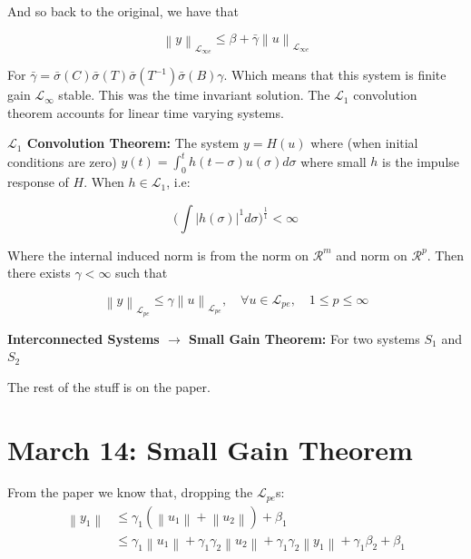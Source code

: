 \documentclass[11pt]{article}
\newcommand{\norm}[1]{\left\lVert#1\right\rVert}
\begin{document}
And so back to the original, we have that 

\begin{equation}
	\norm{y}_{\mathcal{L}_{\infty e}} \leq \beta + \bar{\gamma} \norm{u}_{\mathcal{L}_{\infty e}}
\end{equation}

For $\bar{\gamma} = \bar{\sigma}(C)\bar{\sigma}(T)\bar{\sigma}(T^{-1})\bar{\sigma}(B) \gamma$. Which means that this system is finite gain $\mathcal{L}_{\infty}$ stable. This was the time invariant solution. The $\mathcal{L}_1$ convolution theorem accounts for linear time varying systems. 

\textbf{$\mathcal{L}_1$ Convolution Theorem:} The system $y = H(u)$ where (when initial conditions are zero) $y(t) = \int_0^t h(t-\sigma)u(\sigma)d\sigma$ where small $h$ is the impulse response of $H$. When $h \in \mathcal{L}_1$, i.e: 

\begin{equation}
 \bigg ( \int \rvert h(\sigma) \rvert^1 d\sigma \bigg)^{\frac{1}{1}} < \infty	
\end{equation}

Where the internal induced norm is from the norm on $\mathcal{R}^m$ and norm on $\mathcal{R}^p$. Then there exists $\gamma < \infty$ such that 

\begin{equation}
 \norm{y}_{\mathcal{L}_{pe}} \leq \gamma \norm{u}_{\mathcal{L}_{pe}}, \quad \forall u \in  	\mathcal{L}_{pe}, \quad 1\leq p \leq \infty
\end{equation}



\textbf{Interconnected Systems $\rightarrow$ Small Gain Theorem:} For two systems $S_1$ and $S_2$

The rest of the stuff is on the paper.



\section*{\textbf{March 14: Small Gain Theorem}}

From the paper we know that, dropping the $\mathcal{L}_{pe}$s:
\begin{align}
 \norm{y_1} & \leq \gamma_1 ( \norm{u_1} + \norm{u_2} ) + \beta_1 \\
 			& \leq \gamma_1 \norm{u_1} + \gamma_1 \gamma_2 \norm{u_2} + \gamma_1 \gamma_2 \norm{y_1} + \gamma_1 \beta_2 + \beta_1
\end{align}
\end{document}
